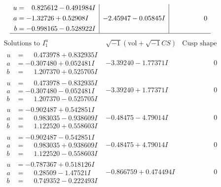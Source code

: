 \documentclass[1p]{elsarticle_modified}
\theoremstyle{definition}
\newcommand{\I}{\sqrt{-1}}
\begin{document}
$$\begin{array}{c|c|c}
\begin{aligned}
u &= \phantom{-}0.825612 - 0.491984 I \\
a &= -1.32726 + 0.52908 I \\
b &= -0.998165 - 0.528922 I\end{aligned}
 & -2.45947 - 0.05845 I & \phantom{-0.000000 } 0\\
 \hline 
 \end{array}$$\newpage$$\begin{array}{c|c|c}  
\text{Solutions to }I^u_{1}& \I (\text{vol} + \sqrt{-1}CS) & \text{Cusp shape}\\
 \hline 
\begin{aligned}
u &= \phantom{-}0.473978 + 0.832935 I \\
a &= -0.307480 + 0.052481 I \\
b &= \phantom{-}1.207370 + 0.525705 I\end{aligned}
 & -3.39240 - 1.77371 I & \phantom{-0.000000 } 0 \\ \hline\begin{aligned}
u &= \phantom{-}0.473978 - 0.832935 I \\
a &= -0.307480 - 0.052481 I \\
b &= \phantom{-}1.207370 - 0.525705 I\end{aligned}
 & -3.39240 + 1.77371 I & \phantom{-0.000000 } 0 \\ \hline\begin{aligned}
u &= -0.902487 + 0.542851 I \\
a &= \phantom{-}0.983035 - 0.938609 I \\
b &= \phantom{-}1.122520 + 0.558603 I\end{aligned}
 & -0.48475 - 4.79014 I & \phantom{-0.000000 } 0 \\ \hline\begin{aligned}
u &= -0.902487 - 0.542851 I \\
a &= \phantom{-}0.983035 + 0.938609 I \\
b &= \phantom{-}1.122520 - 0.558603 I\end{aligned}
 & -0.48475 + 4.79014 I & \phantom{-0.000000 } 0 \\ \hline\begin{aligned}
u &= -0.787367 + 0.518126 I \\
a &= \phantom{-}0.28509 - 1.47521 I \\
b &= \phantom{-}0.749352 - 0.222493 I\end{aligned}
 & -0.866759 + 0.474494 I & \phantom{-0.000000 } 0 \\ \hline\begin{aligned}

\end{aligned}
\end{array}$$
\end{document}
